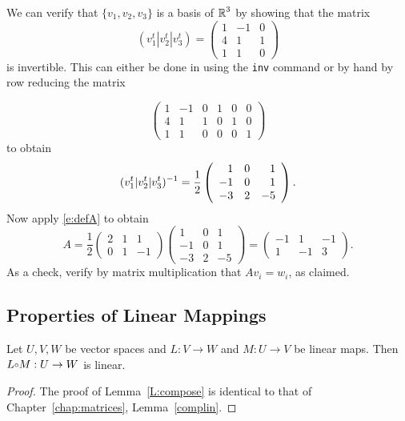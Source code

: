 \documentclass{ximera}
\begin{document}
We can verify that $\{v_1,v_2,v_3\}$ is a basis of $\mbox{$\Bbb{R}$}^3$ by
showing that the matrix
\[
(v_1^t|v_2^t|v_3^t) = \left(\begin{array}{rrr}
1 & -1 & 0  \\
4 & 1 & 1  \\
1 & 1 & 0  \end{array}\right)
\]
is invertible.  This can either be done in \Matlab using the
{\tt inv} command or by hand by row reducing the matrix

\[
\left(\begin{array}{rrr|ccc}
1 & -1 & 0 & 1 & 0 & 0 \\
4 &  1 & 1 & 0 & 1 & 0 \\
1 &  1 & 0 & 0 & 0 & 1  \end{array}\right)
\]
to obtain
\[
(v_1^t|v_2^t|v_3^t)^{-1} = \frac{1}{2}\left(\begin{array}{rrr}
 1 & 0 &  1 \\
-1 & 0 &  1 \\
-3 & 2 & -5
\end{array}\right).
\]
Now apply \eqref{e:defA} to obtain
\[
A = \frac{1}{2} \left(\begin{array}{rrr} 2 & 1 & 1\\ 0 & 1 & -1
\end{array}\right) \left(\begin{array}{rrr}
 1 & 0 &  1 \\
-1 & 0 &  1 \\
-3 & 2 & -5
\end{array}\right) = \left(\begin{array}{rrr} -1 & 1 & -1 \\ 1 & -1 & 3
\end{array}\right).
\]
As a check, verify by matrix multiplication that $Av_i=w_i$, as claimed.


\subsection*{Properties of Linear Mappings}

\begin{lemma} \label{L:compose}
Let $U,V,W$ be vector spaces and $L:V\to W$ and $M:U\to V$ be linear maps.
Then $L\compose M :U\to W$ is linear.
\end{lemma}

\begin{proof} The proof of Lemma~\ref{L:compose} is identical to that of
Chapter~\ref{chap:matrices}, Lemma~\ref{complin}. \end{proof}
\end{document}
